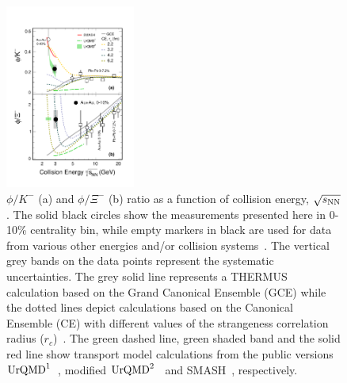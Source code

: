 \documentclass[%
 reprint,	
showpacs,
 amsmath,amssymb,
 aps,
 superscriptaddress,
]{revtex4-1}
\begin{document}
\begin{figure}
\centering
\hspace*{-4mm}
\includegraphics[width=0.38\textwidth]{fig4_phi_over_kminus_zoomin.pdf}
  \caption{$\phi/K^-$ (a) and $\phi/\Xi^-$ (b) ratio as a function of collision energy, $\sqrt{s_{\rm NN}}$. The solid black circles show the measurements presented here in 0-10\% centrality bin, while empty markers in black are used for data from various other energies and/or collision systems~\cite{E917_phi,NA49_phi,FOPI_phi_AlAl,FOPI_phi_NiNi,HADES_phi_ArKCl,HADES_phi_AuAu,Xi_ArKCl_HADES,star_bes_strangeness}. The vertical grey bands on the data points represent the systematic uncertainties. The grey solid line represents a THERMUS calculation based on the Grand Canonical Ensemble (GCE) while the dotted lines depict calculations based on the Canonical Ensemble (CE) with different values of the strangeness correlation radius ($r_c$)~\cite{THERMUS_WHEATON200984,Andronic_2018Naure}. The green dashed line, green shaded band and the solid red line show transport model calculations from the public versions $\textup{UrQMD}^{1}$~\cite{urQMD,UrQMD_2}, modified $\textup{UrQMD}^{2}$~\cite{Steinheimer_2015_UrQMD} and SMASH~\cite{Elfner_SMASH}, respectively.}
\label{fig:phi2Kratio} 
\end{figure}
\end{document}
